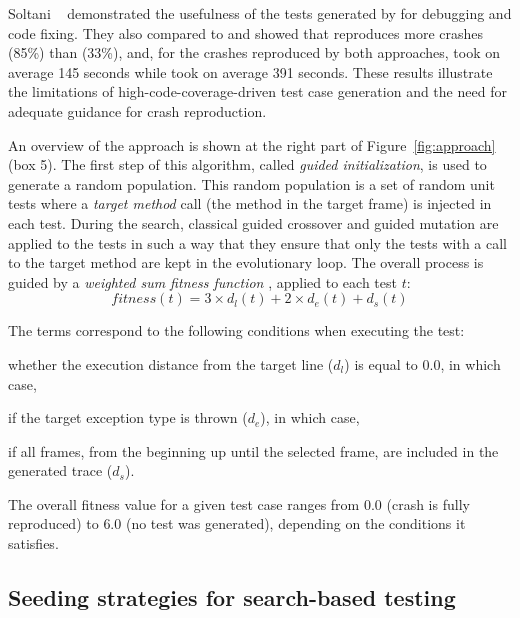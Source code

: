 Soltani \etal~\cite{soltani2017} demonstrated the usefulness of the tests generated by \evocrash for debugging and code fixing. They also compared \evocrash to \evosuite and showed that \evocrash reproduces more crashes (85\%) than \evosuite (33\%), and, for the crashes reproduced by both approaches, \evocrash took on average 145 seconds while \evosuite took on average 391 seconds. These results illustrate the limitations of high-code-coverage-driven test case generation and the need for adequate guidance for crash reproduction. 

An overview of the \evocrash approach is shown at the right part of Figure~\ref{fig:approach} (box 5). The first step of this algorithm, called \emph{guided initialization}, is used to generate a random population. This random population is a set of random unit tests where a \emph{target method}  call (\ie the method in the target frame) is injected in each test. During the search, classical guided crossover and guided mutation are applied to the tests in such a way that they ensure that only the tests with a call to the target method are kept in the evolutionary loop.
%
The overall process is guided by a \emph{weighted sum fitness function} \cite{Soltani2018b}, applied to each  test $t$:
\begin{equation} \label{fitness_function}
%
fitness(t) = 3 \times d_{l}(t) + 2 \times d_{e}(t) + d_{s}(t)
%
\end{equation}

The terms correspond to the following conditions when executing the test:
\begin{inparaenum}[(i)]
\item whether the execution distance from the target line ($d_{l}$) is equal to $0.0$, in which case,
\item if the target exception type is thrown ($d_{e}$), in which case,
\item if all frames, from the beginning up until the selected frame, are included in the generated trace ($d_{s}$).
\end{inparaenum}
The overall fitness value for a given test case ranges from $0.0$ (crash is fully reproduced) to $6.0$ (no test was generated), depending on the conditions it satisfies.


\subsection{Seeding strategies for search-based testing}


